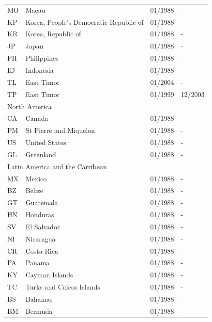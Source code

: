 \begin{footnotesize}
\begin{longtable}{lp{8cm}p{2cm}p{2cm}}
	MO & Macau                                  & 01/1988 & -  \\
	KP & Korea, People's Democratic Republic of & 01/1988 & -  \\
	KR & Korea, Republic of                     & 01/1988 & -  \\
	JP & Japan                                  & 01/1988 & -  \\
	PH & Philippines                            & 01/1988 & -  \\
	ID & Indonesia                              & 01/1988 & -  \\
	TL & East Timor                             & 01/2004 & -  \\
	TP & East Timor                             & 01/1999 & 12/2003  \\
	\midrule
	\multicolumn{3}{l}{North America}  &  \\
	CA & Canada                 & 01/1988 & -  \\
	PM & St Pierre and Miquelon & 01/1988 & -  \\
	US & United States          & 01/1988 & -  \\
	GL & Greenland              & 01/1988 & -  \\
	\midrule
	\multicolumn{3}{l}{Latin America and the Carribean}  &  \\
	MX & Mexico                                   & 01/1988 & -  \\
	BZ & Belize                                   & 01/1988 & -  \\
	GT & Guatemala                                & 01/1988 & -  \\
	HN & Honduras                                 & 01/1988 & -  \\
	SV & El Salvador                              & 01/1988 & -  \\
	NI & Nicaragua                                & 01/1988 & -  \\
	CR & Costa Rica                               & 01/1988 & -  \\
	PA & Panama                                   & 01/1988 & -  \\
	KY & Cayman Islands                           & 01/1988 & -  \\
	TC & Turks and Caicos Islands                 & 01/1988 & -  \\
	BS & Bahamas                                  & 01/1988 & -  \\
	BM & Bermuda                                  & 01/1988 & -  \\

\end{longtable}
\end{footnotesize}
